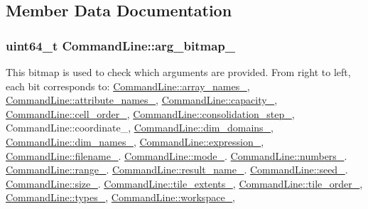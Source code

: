 \subsection{Member Data Documentation}
\hypertarget{classCommandLine_ab9c3f466109c4f8c0e21003af135482a}{}
\subsubsection[{arg\+\_\+bitmap\+\_\+}]{\setlength{\rightskip}{0pt plus 5cm}uint64\+\_\+t Command\+Line\+::arg\+\_\+bitmap\+\_\+}\label{classCommandLine_ab9c3f466109c4f8c0e21003af135482a}
This bitmap is used to check which arguments are provided. From right to left, each bit corresponds to\+: \hyperlink{classCommandLine_ac33bfae7756e68fa2f7fc2538cf4a8ac}{Command\+Line\+::array\+\_\+names\+\_\+}, \hyperlink{classCommandLine_ad900ef70d91535497ecedc948254805a}{Command\+Line\+::attribute\+\_\+names\+\_\+}, \hyperlink{classCommandLine_a4b2c6066274035a5bea2adcbe71bcfa3}{Command\+Line\+::capacity\+\_\+}, \hyperlink{classCommandLine_a881b548c171d82e592d19b8f91b7c4fe}{Command\+Line\+::cell\+\_\+order\+\_\+}, \hyperlink{classCommandLine_abb7c1c0a9693309c885c69c7d8243215}{Command\+Line\+::consolidation\+\_\+step\+\_\+}, Command\+Line\+::coordinate\+\_\+, \hyperlink{classCommandLine_ab75e4302c09ff1ca0cc099374e914b93}{Command\+Line\+::dim\+\_\+domains\+\_\+}, \hyperlink{classCommandLine_a5d7aca6c2ef5530d8f53850b485d93d2}{Command\+Line\+::dim\+\_\+names\+\_\+}, \hyperlink{classCommandLine_a4503d0d4214e51a6884629b29e771ed7}{Command\+Line\+::expression\+\_\+}, \hyperlink{classCommandLine_aa4e002e557fc4b4974daa827a3883930}{Command\+Line\+::filename\+\_\+}. \hyperlink{classCommandLine_a584f279447430b2da687a3d5687c4d7e}{Command\+Line\+::mode\+\_\+}. \hyperlink{classCommandLine_a75a014324b812198360edc99ad4e84b6}{Command\+Line\+::numbers\+\_\+}. \hyperlink{classCommandLine_a2df474de00bbcd25dfacacf28494220f}{Command\+Line\+::range\+\_\+}. \hyperlink{classCommandLine_a86248cf2fea828b7be7c3e4a174e3794}{Command\+Line\+::result\+\_\+name\+\_\+}. \hyperlink{classCommandLine_a84c6395881d3fec0f25c260e8b2b2cb1}{Command\+Line\+::seed\+\_\+}. \hyperlink{classCommandLine_a3f975e511512f21d28eeccd2ceb62ffd}{Command\+Line\+::size\+\_\+}. \hyperlink{classCommandLine_a2cd185d5e741976d04fd85f8ca22b1d1}{Command\+Line\+::tile\+\_\+extents\+\_\+}, \hyperlink{classCommandLine_a5d0c027e4b28133f763a1d1c9296b248}{Command\+Line\+::tile\+\_\+order\+\_\+}, \hyperlink{classCommandLine_a175f51137314bb9d0097e25130fed261}{Command\+Line\+::types\+\_\+}, \hyperlink{classCommandLine_af9e82c06074c1bcb828b6d76e6285536}{Command\+Line\+::workspace\+\_\+}, \hypertarget{classCommandLine_ac33bfae7756e68fa2f7fc2538cf4a8ac}{}
